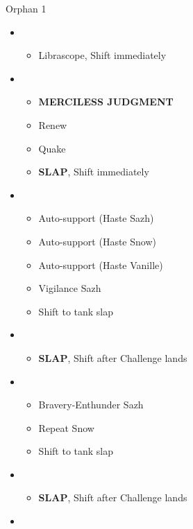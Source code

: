 \begin{battle}{Orphan 1}
	\begin{multicols}{2}
		\begin{itemize}
			\item \second
			      \begin{itemize}
				      \item Librascope, Shift immediately
			      \end{itemize}
			\item \third
			      \begin{itemize}
				      \item \textbf{MERCILESS JUDGMENT}
				      \item Renew
				      \item Quake
				      \item \textbf{SLAP}, Shift immediately
			      \end{itemize}
			\item \fourth
			      \begin{itemize}
				      \item Auto-support (Haste Sazh)
				      \item Auto-support (Haste Snow)
				      \item Auto-support (Haste Vanille)
				      \item Vigilance Sazh
				      \item Shift to tank slap
			      \end{itemize}
			\item \third
			      \begin{itemize}
				      \item \textbf{SLAP}, Shift after Challenge lands
			      \end{itemize}
			\item \fourth
			      \begin{itemize}
				      \item Bravery-Enthunder Sazh
				      \item Repeat Snow
				      \item Shift to tank slap
			      \end{itemize}
			\item \third
			      \begin{itemize}
				      \item \textbf{SLAP}, Shift after Challenge lands
			      \end{itemize}
			\item \fifth
			      \begin{itemize}

\end{itemize}
\end{itemize}
\end{multicols}
\end{battle}

